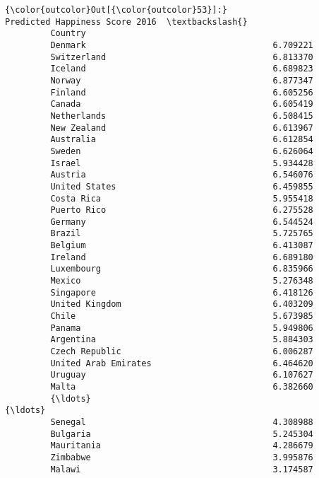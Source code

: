 \documentclass[11pt]{article}
\begin{document}
\begin{Verbatim}[commandchars=\\\{\}]
{\color{outcolor}Out[{\color{outcolor}53}]:}                       Predicted Happiness Score 2016  \textbackslash{}
         Country                                                
         Denmark                                     6.709221   
         Switzerland                                 6.813370   
         Iceland                                     6.689823   
         Norway                                      6.877347   
         Finland                                     6.605256   
         Canada                                      6.605419   
         Netherlands                                 6.508415   
         New Zealand                                 6.613967   
         Australia                                   6.612854   
         Sweden                                      6.626064   
         Israel                                      5.934428   
         Austria                                     6.546076   
         United States                               6.459855   
         Costa Rica                                  5.955418   
         Puerto Rico                                 6.275528   
         Germany                                     6.544524   
         Brazil                                      5.725765   
         Belgium                                     6.413087   
         Ireland                                     6.689180   
         Luxembourg                                  6.835966   
         Mexico                                      5.276348   
         Singapore                                   6.418126   
         United Kingdom                              6.403209   
         Chile                                       5.673985   
         Panama                                      5.949806   
         Argentina                                   5.884303   
         Czech Republic                              6.006287   
         United Arab Emirates                        6.464620   
         Uruguay                                     6.107627   
         Malta                                       6.382660   
         {\ldots}                                              {\ldots}   
         Senegal                                     4.308988   
         Bulgaria                                    5.245304   
         Mauritania                                  4.286679   
         Zimbabwe                                    3.995876   
         Malawi                                      3.174587   

\end{Verbatim}
\end{document}
